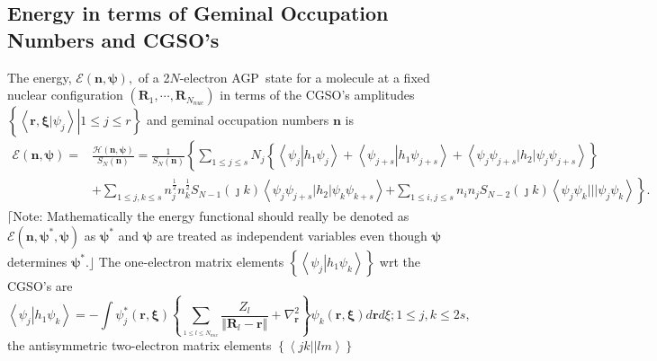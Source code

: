 \documentclass[aps,preprint]{revtex4}%
\begin{document}
\subsection{Energy in terms of Geminal Occupation Numbers and CGSO's}

The energy, $\mathcal{E}\left(  \mathbf{n,\psi}\right)  ,$ of a 2$N$-electron
AGP\ state for a molecule at a fixed nuclear configuration $\left(
\mathbf{R}_{1},\cdots,\mathbf{R}_{N_{nuc}}\right)  $ in terms of the CGSO's
amplitudes $\left\{  \left.  \left\langle \left.  \mathbf{r,\xi}\right\vert
\psi_{j}\right\rangle \right\vert 1\leq j\leq r\right\}  $ and geminal
occupation numbers $\mathbf{n}$ is
\begin{align}
\mathcal{E}\left(  \mathbf{n,\psi}\right)  =  &  \frac{\mathcal{H}\left(
\mathbf{n,\psi}\right)  }{S_{N}\left(  \mathbf{n}\right)  }=\frac{1}%
{S_{N}\left(  \mathbf{n}\right)  }\left\{  \sum_{1\leq j\leq s}N_{j}\left\{
\left\langle \psi_{j}\left\vert h_{1}\psi_{j}\right.  \right\rangle
+\left\langle \psi_{j+s}\left\vert h_{1}\psi_{j+s}\right.  \right\rangle
+\left\langle \psi_{j}\psi_{j+s}|h_{2}|\psi_{j}\psi_{j+s}\right\rangle
\right\}  \right. \nonumber\\
&  +\sum_{1\leq j,k\leq s}n_{j}^{\frac{1}{2}}n_{k}^{\frac{1}{2}}S_{N-1}\left(
\jmath k\right)  \left\langle \psi_{j}\psi_{j+s}|h_{2}|\psi_{k}\psi
_{k+s}\right\rangle \left.  +\sum_{1\leq i,j\leq s}n_{i}n_{j}S_{N-2}\left(
\jmath k\right)  \left\langle \psi_{j}\psi_{k}|||\psi_{j}\psi_{k}\right\rangle
\right\}  . \label{energy}%
\end{align}
$\lceil$Note: Mathematically the energy functional should really be denoted as
$\mathcal{E}\left(  \mathbf{n,\psi}^{\ast}\mathbf{,\psi}\right)  $ as
$\mathbf{\psi}^{\ast}$ and $\mathbf{\psi}$ are treated as independent
variables even though $\mathbf{\psi}$ determines $\mathbf{\psi}^{\ast}%
$.$\rfloor$ The one-electron matrix elements $\left\{  \left\langle \psi
_{j}\left\vert h_{1}\psi_{k}\right.  \right\rangle \right\}  $ wrt the CGSO's
are
\begin{equation}
\left\langle \psi_{j}\left\vert h_{1}\psi_{k}\right.  \right\rangle =-\int
\psi_{j}^{\ast}\left(  \mathbf{r,\xi}\right)  \left\{  \sum_{_{1\leq l\leq
N_{nuc}}}\frac{Z_{l}}{\left\Vert \mathbf{R}_{l}-\mathbf{r}\right\Vert }%
+\nabla_{\mathbf{r}}^{2}\right\}  \psi_{k}\left(  \mathbf{r,\xi}\right)
d\mathbf{r}d\xi;1\leq j,k\leq2s, \label{h1}%
\end{equation}
the antisymmetric two-electron matrix elements $\left\{  \left\langle
jk||lm\right\rangle \right\}  $
\end{document}
